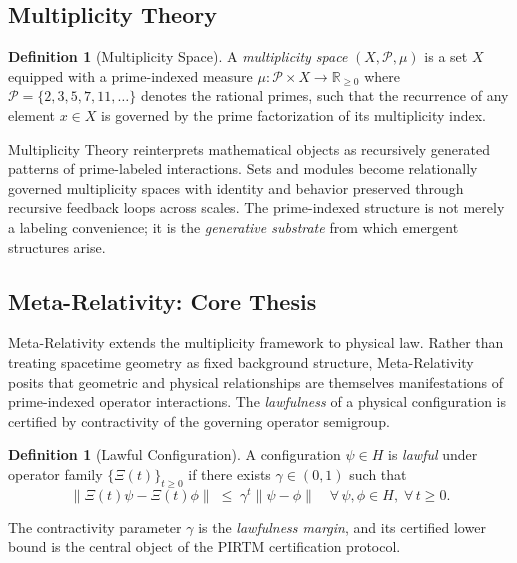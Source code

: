 \documentclass[12pt,letterpaper]{article}
\theoremstyle{definition}
\newtheorem{definition}[theorem]{Definition}
\theoremstyle{remark}
\begin{document}
\subsection{Multiplicity Theory}

\begin{definition}[Multiplicity Space]
A \emph{multiplicity space} $(X, \mathcal{P}, \mu)$ is a set $X$ equipped
with a prime-indexed measure $\mu \colon \mathcal{P} \times X \to \mathbb{R}_{\geq 0}$
where $\mathcal{P} = \{2, 3, 5, 7, 11, \ldots\}$ denotes the rational primes,
such that the recurrence of any element $x \in X$ is governed by the
prime factorization of its multiplicity index.
\end{definition}

Multiplicity Theory reinterprets mathematical objects as recursively generated
patterns of prime-labeled interactions. Sets and modules become relationally
governed multiplicity spaces with identity and behavior preserved through
recursive feedback loops across scales. The prime-indexed structure is not
merely a labeling convenience; it is the \emph{generative substrate} from
which emergent structures arise.

\subsection{Meta-Relativity: Core Thesis}

Meta-Relativity extends the multiplicity framework to physical law. Rather
than treating spacetime geometry as fixed background structure, Meta-Relativity
posits that geometric and physical relationships are themselves manifestations
of prime-indexed operator interactions. The \emph{lawfulness} of a physical
configuration is certified by contractivity of the governing operator semigroup.

\begin{definition}[Lawful Configuration]
A configuration $\psi \in H$ is \emph{lawful} under operator family
$\{\Xi(t)\}_{t \geq 0}$ if there exists $\gamma \in (0,1)$ such that
\[
  \|\Xi(t)\psi - \Xi(t)\phi\| \;\leq\; \gamma^t \|\psi - \phi\|
  \quad \forall\, \psi, \phi \in H,\; \forall\, t \geq 0.
\]
\end{definition}

The contractivity parameter $\gamma$ is the \emph{lawfulness margin}, and its
certified lower bound is the central object of the PIRTM certification protocol.

\end{document}
